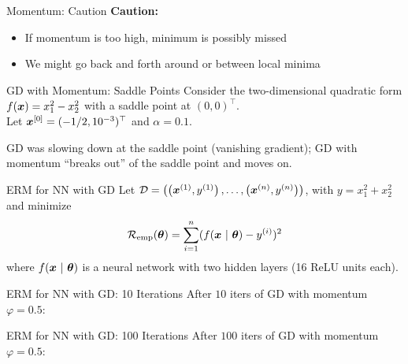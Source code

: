 \documentclass[11pt,compress,t,notes=noshow, xcolor=table]{beamer}
\begin{document}
\begin{framev}{Momentum: Caution}
\textbf{Caution:}
\begin{itemize}
\item If momentum is too high, minimum is possibly missed
\item We might go back and forth around or between local minima
\end{itemize}
\end{framev}


\begin{framev}{GD with Momentum: Saddle Points}
Consider the two-dimensional quadratic form $f(\bm{x}) = x_{1}^{2} - x_{2}^{2}$ with a saddle point at $(0, 0)^\top$.\\
\vfill
Let $\bm{x}^{[0]} = (-1/2, 10^{-3})^\top$ and $\alpha = 0.1$.
\begin{itemizeS}[footnotesize]
\item[] GD was slowing down at the saddle point (vanishing gradient); GD with momentum ``breaks out'' of the saddle point and moves on.
\end{itemizeS}
\end{framev}


\begin{framev}{ERM for NN with GD}
Let $\mathcal{D} = \left( \left(\bm{x}^{(1)}, y^{(1)}\right), \ldots, \left(\bm{x}^{(n)}, y^{(n)}\right)\right)$, with $y = x_1^2 + x_2^2$ and minimize
$$
\mathcal{R}_{\text{emp}}(\bm{\theta}) = \sum\limits_{i=1}^n (f(\bm{x} ~|~ \bm{\theta}) - y^{(i)})^2
$$
where $f(\bm{x} ~|~ \bm{\theta})$ is a neural network with two hidden layers (16 ReLU units each).
\vspace{-1cm}
\end{framev}


\begin{framev}[align=top]{ERM for NN with GD: 10 Iterations}
After $10$ iters of GD with momentum $\varphi = 0.5$:
\end{framev}


\begin{framev}[align=top]{ERM for NN with GD: 100 Iterations}
After $100$ iters of GD with momentum $\varphi = 0.5$:
\end{framev}
\end{document}

